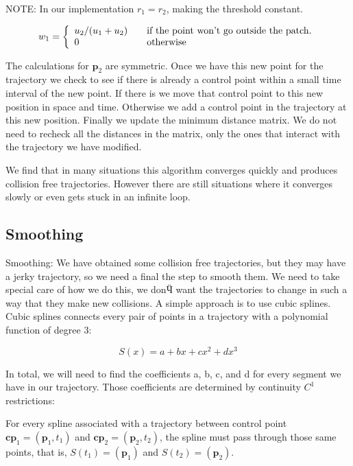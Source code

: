 NOTE: In our implementation $r_1 = r_2$, making the threshold constant.

\begin{equation}
w_1 = \left\{
	\begin{array}{l l}
		u_2 / (u_1 + u_2)	&	\quad \text{if the point won't go outside the patch.}\\
		0								&	\quad \text{otherwise}
	\end{array}
	\right.
\end{equation}

The calculations for $\mathbf{p}_2$ are symmetric. Once we have this new point for the trajectory we check to see if there is already a control point within a small time interval of the new point. If there is we move that control point to this new position in space and time. Otherwise we add a control 
point in the trajectory at this new position. Finally we update the minimum distance matrix. We do not need to recheck all the distances in the matrix, only the ones that interact with the trajectory we have modified.

We find that in many situations this algorithm converges quickly and produces collision free trajectories. However there are still situations where it converges slowly or even gets stuck in an infinite loop.

\subsection{Smoothing}

Smoothing:
We have obtained some collision free trajectories, but they may have a jerky trajectory, so we need a final the step to smooth them. We need to take special care of how we do this, we donӴ want the trajectories to change in such a way that they make new collisions. A simple approach is to use cubic splines. Cubic splines connects every pair of points in a trajectory with a polynomial function of degree $3$:

\begin{equation}
 S(x)=a+bx+ cx^2+ dx^3
\end{equation}

In total, we will need to find the coefficients a, b, c, and d for every segment we have in our trajectory. Those coefficients are determined by continuity $C^1$ restrictions: 

For every spline associated with a trajectory between control point $\mathbf{cp}_1=(\mathbf{p}_1,t_1)$ and $\mathbf{cp}_2=(\mathbf{p}_2,t_2)$, the spline must pass through those same points, that is, $S(t_1)=(\mathbf{p}_1)$ and $S(t_2)=(\mathbf{p}_2)$.

